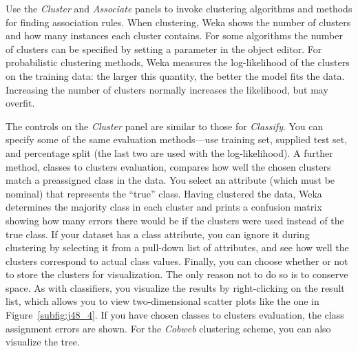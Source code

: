 Use the \textit{Cluster} and \textit{Associate} panels to invoke
clustering algorithms and methods for finding association rules. When
clustering, Weka shows the number of clusters and how many instances
each cluster contains. For some algorithms the number of clusters can
be specified by setting a parameter in the object editor. For
probabilistic clustering methods, Weka measures the log-likelihood of
the clusters on the training data: the larger this quantity, the
better the model fits the data. Increasing the number of clusters
normally increases the likelihood, but may overfit.

The controls on the \textit{Cluster} panel are similar to those for
\textit{Classify}. You can specify some of the same evaluation
methods---use training set, supplied test set, and percentage split
(the last two are used with the log-likelihood). A further method,
classes to clusters evaluation, compares how well the chosen clusters
match a preassigned class in the data. You select an attribute (which
must be nominal) that represents the ``true'' class. Having clustered
the data, Weka determines the majority class in each cluster and
prints a confusion matrix showing how many errors there would be if
the clusters were used instead of the true class. If your dataset has
a class attribute, you can ignore it during clustering by selecting it
from a pull-down list of attributes, and see how well the clusters
correspond to actual class values. Finally, you can choose whether or
not to store the clusters for visualization. The only reason not to do
so is to conserve space. As with classifiers, you visualize the
results by right-clicking on the result list, which allows you to view
two-dimensional scatter plots like the one in
Figure~\ref{subfig:j48_4}. If you have chosen classes to clusters
evaluation, the class assignment errors are shown. For the
\textit{Cobweb} clustering scheme, you can also visualize the tree.


